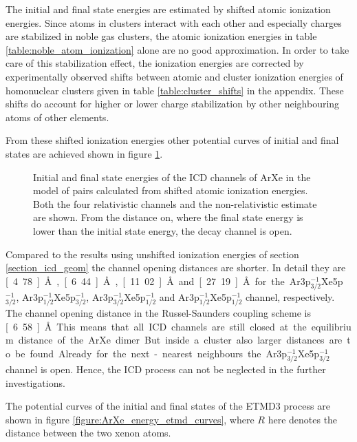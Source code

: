 The initial and final state energies are estimated by shifted atomic
ionization energies.
Since atoms in clusters interact with each other and especially
charges are stabilized in noble gas clusters, the atomic
ionization energies  in table \ref{table:noble_atom_ionization} alone
are no good approximation. In order to take care of
this stabilization effect, the ionization energies are corrected by experimentally
observed shifts between atomic and cluster ionization energies of homonuclear
clusters given in table
\ref{table:cluster_shifts} in the appendix. These shifts do account for
higher or
lower charge stabilization by other neighbouring atoms of other elements.

From these shifted ionization energies other potential curves of initial and
final states are achieved shown in figure \ref{ArXe_energy_curves_shifted}.

\begin{figure}[htb]
 \centering
 
 \caption{Initial and final state energies of the ICD channels of ArXe in the
          model of pairs calculated from shifted atomic ionization energies.
          Both the four relativistic channels and
          the non-relativistic estimate are shown. From the distance on, where
          the final state energy is lower than the initial state energy, the
          decay channel is open.}
 \label{ArXe_energy_curves_shifted}
\end{figure}

Compared to the results using unshifted ionization energies of section
\ref{section_icd_geom} the
channel opening distances are shorter.
In detail they are \unit[4.78]{\AA}, \unit[6.44]{\AA}, \unit[11.02]{\AA}
and \unit[27.19]{\AA} for the Ar3p$_{3/2}^{-1}$Xe5p$_{3/2}^{-1}$,
Ar3p$_{1/2}^{-1}$Xe5p$_{3/2}^{-1}$, Ar3p$_{3/2}^{-1}$Xe5p$_{1/2}^{-1}$ and
Ar3p$_{1/2}^{-1}$Xe5p$_{1/2}^{-1}$ channel, respectively. The channel
opening distance in the Russel-Saunders coupling scheme is \unit[6.58]{\AA}.
This means that all \ac{ICD} channels are still closed at the equilibrium
distance of the ArXe dimer. But inside a cluster also larger distances are
to be found. Already for the next-nearest neighbours the
Ar3p$_{3/2}^{-1}$Xe5p$_{3/2}^{-1}$ channel is open. Hence, the \ac{ICD}
process can not be neglected in the further investigations.

The potential curves of the initial and final states of the \ac{ETMD}3
process are shown in figure \ref{figure:ArXe_energy_etmd_curves}, where
$R$ here denotes the distance between the two xenon atoms.

